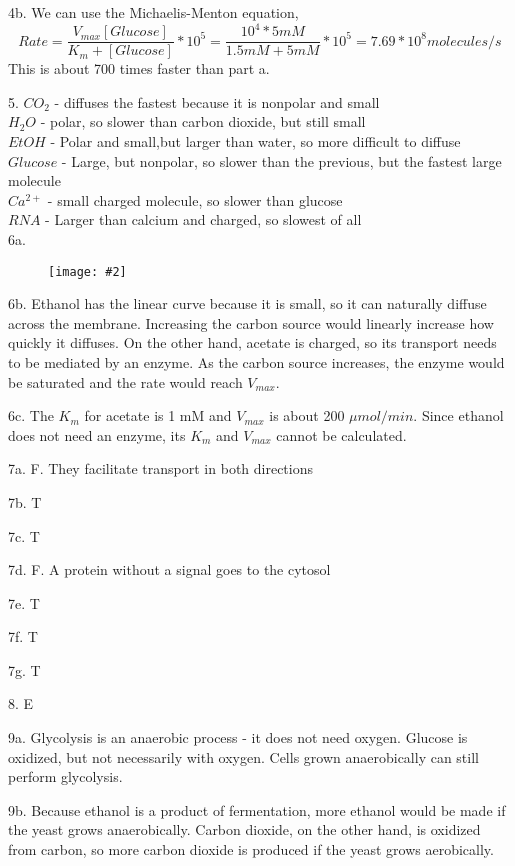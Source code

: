 \documentclass{article}
\newcommand{\makefig}[2]{
\begin{figure}[h]
\centering
\texttt{[image: \#2]}
\end{figure}
}
\begin{document}
4b. We can use the Michaelis-Menton equation,
$$Rate = \frac{V_{max}[Glucose]}{K_m+[Glucose]}*10^5=\frac{10^4*5mM}{1.5mM+5mM}*10^5=7.69*10^8 molecules/s$$
This is about 700 times faster than part a.
\vspace{5mm}

5. $CO_2$ - diffuses the fastest because it is nonpolar and small\\
$H_2O$ - polar, so slower than carbon dioxide, but still small\\
$EtOH$ - Polar and small,but larger than water, so more difficult to diffuse\\
$Glucose$ - Large, but nonpolar, so slower than the previous, but the fastest large molecule\\
$Ca^{2+}$ - small charged molecule, so slower than glucose\\
$RNA$ - Larger than calcium and charged, so slowest of all\\

6a. \makefig{0.5}{P6.png}

6b. Ethanol has the linear curve because it is small, so it can naturally diffuse across the membrane. Increasing the carbon source would linearly increase how quickly it diffuses. On the other hand, acetate is charged, so its transport needs to be mediated by an enzyme. As the carbon source increases, the enzyme would be saturated and the rate would reach $V_{max}$.

6c. The $K_m$ for acetate is 1 mM and $V_{max}$ is about 200 $\mu mol/min$. Since ethanol does not need an enzyme, its $K_m$ and $V_{max}$ cannot be calculated.

7a. F. They facilitate transport in both directions

7b. T

7c. T

7d. F. A protein without a signal goes to the cytosol

7e. T

7f. T

7g. T
\vspace{5mm}
 
8. E
\vspace{5mm}

9a. Glycolysis is an anaerobic process - it does not need oxygen. Glucose is oxidized, but not necessarily with oxygen. Cells grown anaerobically can still perform glycolysis.

9b. Because ethanol is a product of fermentation, more ethanol would be made if the yeast grows anaerobically. Carbon dioxide, on the other hand, is oxidized from carbon, so more carbon dioxide is produced if the yeast grows aerobically.
\end{document}

